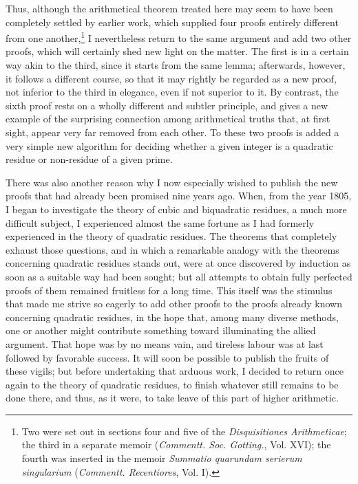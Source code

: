 \documentclass[12pt]{article}
\begin{document}
Thus, although the arithmetical theorem treated here may seem to have been completely settled by earlier work, which supplied four proofs entirely different from one another,\footnote{Two were set out in sections four and five of the \emph{Disquisitiones Arithmeticae}; the third in a separate memoir (\emph{Commentt. Soc. Gotting.}, Vol. XVI); the fourth was inserted in the memoir \emph{Summatio quarundam serierum singularium} (\emph{Commentt. Recentiores}, Vol. I).} I nevertheless return to the same argument and add two other proofs, which will certainly shed new light on the matter. The first is in a certain way akin to the third, since it starts from the same lemma; afterwards, however, it follows a different course, so that it may rightly be regarded as a new proof, not inferior to the third in elegance, even if not superior to it. By contrast, the sixth proof rests on a wholly different and subtler principle, and gives a new example of the surprising connection among arithmetical truths that, at first sight, appear very far removed from each other. To these two proofs is added a very simple new algorithm for deciding whether a given integer is a quadratic residue or non-residue of a given prime.

There was also another reason why I now especially wished to publish the new proofs that had already been promised nine years ago. When, from the year 1805, I began to investigate the theory of cubic and biquadratic residues, a much more difficult subject, I experienced almost the same fortune as I had formerly experienced in the theory of quadratic residues. The theorems that completely exhaust those questions, and in which a remarkable analogy with the theorems concerning quadratic residues stands out, were at once discovered by induction as soon as a suitable way had been sought; but all attempts to obtain fully perfected proofs of them remained fruitless for a long time. This itself was the stimulus that made me strive so eagerly to add other proofs to the proofs already known concerning quadratic residues, in the hope that, among many diverse methods, one or another might contribute something toward illuminating the allied argument. That hope was by no means vain, and tireless labour was at last followed by favorable success. It will soon be possible to publish the fruits of these vigils; but before undertaking that arduous work, I decided to return once again to the theory of quadratic residues, to finish whatever still remains to be done there, and thus, as it were, to take leave of this part of higher arithmetic.
\end{document}
